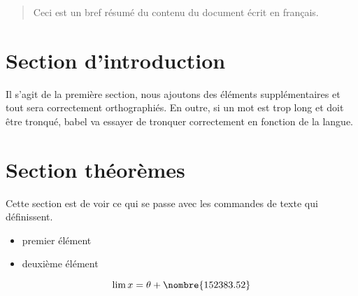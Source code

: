 \documentclass[a4paper,12pt]{scrartcl}
\begin{document}
\vspace{2cm} %

\begin{abstract}
Ceci est un bref résumé du contenu du document écrit en français.
\end{abstract}

\section{Section d'introduction}
Il s'agit de la première section, nous ajoutons des éléments supplémentaires et tout sera correctement orthographiés. En outre, si un mot est trop long et doit être tronqué, babel va essayer de tronquer correctement en fonction de la langue.

\section{Section théorèmes}
Cette section est de voir ce qui se passe avec les commandes de texte qui définissent.

\begin{itemize}
\item premier élément
\item deuxième élément
\end{itemize}

\[ \lim x =  \theta + \nombre{152383.52} \]
\end{document}
